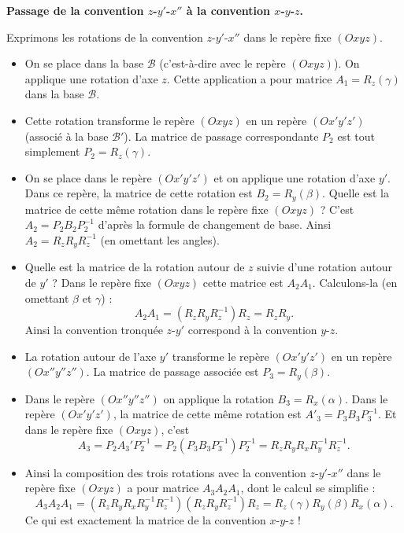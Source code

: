 \documentclass[11pt,class=report,crop=false]{standalone}
\begin{document}
\textbf{Passage de la convention $z$-$y'$-$x''$ à la convention $x$-$y$-$z$.}

Exprimons les rotations de la convention $z$-$y'$-$x''$ dans le repère fixe $(Oxyz)$.
\begin{itemize}
  \item On se place dans la base $\mathcal{B}$ (c'est-à-dire avec le repère $(Oxyz)$). On applique une rotation d'axe $z$. Cette application a pour matrice $A_1 = R_z(\gamma)$ dans la base $\mathcal{B}$.

  \item Cette rotation transforme le repère $(Oxyz)$ en un repère $(Ox'y'z')$ (associé à la base $\mathcal{B}'$). La matrice de passage correspondante $P_2$ est tout simplement $P_2 = R_z(\gamma)$.

  \item On se place dans le repère $(Ox'y'z')$ et on applique une rotation d'axe $y'$. Dans ce repère, la matrice de cette rotation est $B_2 = R_y(\beta)$. Quelle est la matrice de cette même rotation dans le repère fixe $(Oxyz)$ ?
  C'est $A_2 = P_2 B_2 P_2^{-1}$ d'après la formule de changement de base.
  Ainsi $A_2 = R_z R_y  R_z^{-1}$ (en omettant les angles).

  \item Quelle est la matrice de la rotation autour de $z$ suivie d'une rotation autour de $y'$ ?
  Dans le repère fixe $(Oxyz)$ cette matrice est $A_2A_1$. Calculons-la (en omettant $\beta$ et $\gamma$) :
  $$A_2 A_1 = (R_z R_y  R_z^{-1}) R_z = R_z R_y.$$
  Ainsi la convention tronquée $z$-$y'$ correspond à la convention $y$-$z$.

  \item La rotation autour de l'axe $y'$ transforme le repère $(Ox'y'z')$ en un repère $(Ox''y''z'')$. La matrice de passage associée est $P_3 = R_y(\beta)$.

  \item Dans le repère $(Ox''y''z'')$ on applique la rotation $B_3 = R_x(\alpha)$. Dans le repère $(Ox'y'z')$, la matrice de cette même rotation est $A'_3 = P_3 B_3 P_3^{-1}$. Et dans le repère fixe  $(Oxyz)$, c'est
  $$A_3 = P_2 A_3' P_2^{-1} = P_2 (P_3 B_3 P_3^{-1}) P_2^{-1} = R_z R_y R_x R_ y^{-1} R_z^{-1}.$$

  \item Ainsi la composition des trois rotations avec la convention $z$-$y'$-$x''$ dans le repère fixe $(Oxyz)$ a pour matrice $A_3A_2A_1$, dont le calcul se simplifie :
  $$A_3A_2A_1 = (R_z R_y R_x R_ y^{-1} R_z^{-1}) (R_z R_y  R_z^{-1}) R_z = R_z(\gamma) R_y(\beta) R_x(\alpha).$$
  Ce qui est exactement la matrice de la convention $x$-$y$-$z$ !

\end{itemize}
\end{document}
